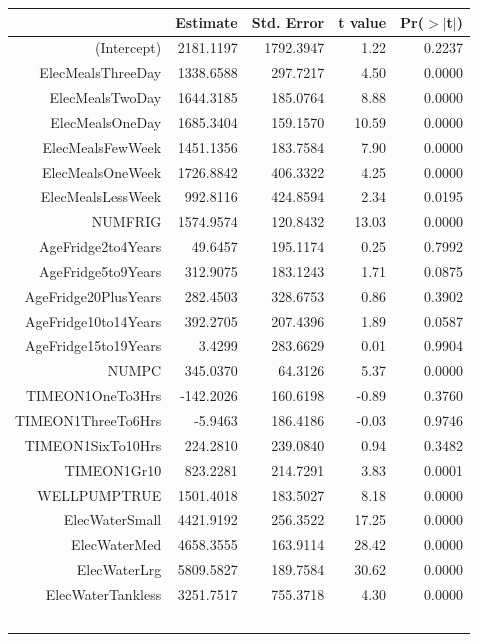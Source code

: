 \documentclass{article}
\begin{document}
\begin{table}[ht]
\centering
\begin{tabular}{rrrrr}
  \hline
 & Estimate & Std. Error & t value & Pr($>$$|$t$|$) \\ 
  \hline
(Intercept) & 2181.1197 & 1792.3947 & 1.22 & 0.2237 \\ 
  ElecMealsThreeDay & 1338.6588 & 297.7217 & 4.50 & 0.0000 \\ 
  ElecMealsTwoDay & 1644.3185 & 185.0764 & 8.88 & 0.0000 \\ 
  ElecMealsOneDay & 1685.3404 & 159.1570 & 10.59 & 0.0000 \\ 
  ElecMealsFewWeek & 1451.1356 & 183.7584 & 7.90 & 0.0000 \\ 
  ElecMealsOneWeek & 1726.8842 & 406.3322 & 4.25 & 0.0000 \\ 
  ElecMealsLessWeek & 992.8116 & 424.8594 & 2.34 & 0.0195 \\ 
  NUMFRIG & 1574.9574 & 120.8432 & 13.03 & 0.0000 \\ 
  AgeFridge2to4Years & 49.6457 & 195.1174 & 0.25 & 0.7992 \\ 
  AgeFridge5to9Years & 312.9075 & 183.1243 & 1.71 & 0.0875 \\ 
  AgeFridge20PlusYears & 282.4503 & 328.6753 & 0.86 & 0.3902 \\ 
  AgeFridge10to14Years & 392.2705 & 207.4396 & 1.89 & 0.0587 \\ 
  AgeFridge15to19Years & 3.4299 & 283.6629 & 0.01 & 0.9904 \\ 
  NUMPC & 345.0370 & 64.3126 & 5.37 & 0.0000 \\ 
  TIMEON1OneTo3Hrs & -142.2026 & 160.6198 & -0.89 & 0.3760 \\ 
  TIMEON1ThreeTo6Hrs & -5.9463 & 186.4186 & -0.03 & 0.9746 \\ 
  TIMEON1SixTo10Hrs & 224.2810 & 239.0840 & 0.94 & 0.3482 \\ 
  TIMEON1Gr10 & 823.2281 & 214.7291 & 3.83 & 0.0001 \\ 
  WELLPUMPTRUE & 1501.4018 & 183.5027 & 8.18 & 0.0000 \\ 
  ElecWaterSmall & 4421.9192 & 256.3522 & 17.25 & 0.0000 \\ 
  ElecWaterMed & 4658.3555 & 163.9114 & 28.42 & 0.0000 \\ 
  ElecWaterLrg & 5809.5827 & 189.7584 & 30.62 & 0.0000 \\ 
  ElecWaterTankless & 3251.7517 & 755.3718 & 4.30 & 0.0000 \\ 
$$
\end{tabular}
\end{table}
\end{document}
